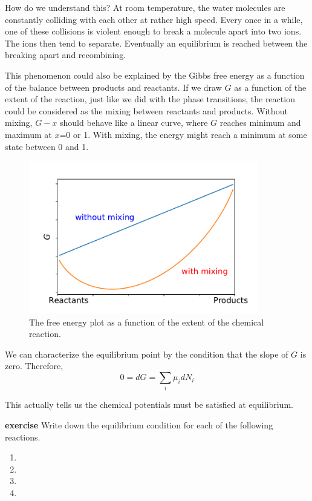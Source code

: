 How do we understand this? At room temperature, the water molecules are constantly colliding with each other at rather high speed. Every once in a while, one of these collisions is violent enough to break a molecule apart into two ions. The ions then tend to separate. Eventually an equilibrium is reached between the breaking apart and recombining.

This phenomenon could also be explained by the Gibbs free energy as a function of the balance between products and reactants. If we draw $G$ as a function of the extent of the reaction, just like we did with the phase transitions, the reaction could be considered as the mixing between reactants and products. Without mixing, $G-x$ should behave like a linear curve, where $G$ reaches minimum and maximum at $x$=0 or 1. With mixing, the energy might reach a minimum at some state between 0 and 1.

\begin{figure}[h]
\centering
\includegraphics[width=10cm]{imgs/Reaction.pdf}
\caption{The free energy plot as a function of the extent of the chemical reaction. }
\end{figure}


We can characterize the equilibrium point by the condition that the slope of $G$ is zero. Therefore,
\begin{equation} 
0 = dG = \sum_i \mu_i dN_i
\end{equation} 

This actually tells us the chemical potentials must be satisfied at equilibrium.

{\bf exercise} Write down the equilibrium condition for each of the following reactions.
\begin{enumerate}
\item {}
\item {}
\item {}
\item {}
\end{enumerate}

